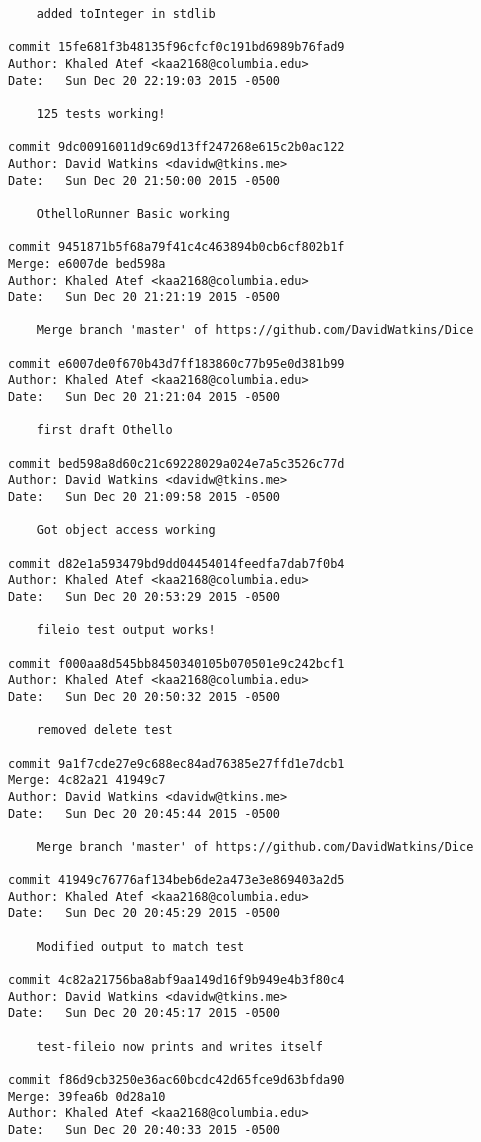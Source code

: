 \begin{verbatim}
    added toInteger in stdlib

commit 15fe681f3b48135f96cfcf0c191bd6989b76fad9
Author: Khaled Atef <kaa2168@columbia.edu>
Date:   Sun Dec 20 22:19:03 2015 -0500

    125 tests working!

commit 9dc00916011d9c69d13ff247268e615c2b0ac122
Author: David Watkins <davidw@tkins.me>
Date:   Sun Dec 20 21:50:00 2015 -0500

    OthelloRunner Basic working

commit 9451871b5f68a79f41c4c463894b0cb6cf802b1f
Merge: e6007de bed598a
Author: Khaled Atef <kaa2168@columbia.edu>
Date:   Sun Dec 20 21:21:19 2015 -0500

    Merge branch 'master' of https://github.com/DavidWatkins/Dice

commit e6007de0f670b43d7ff183860c77b95e0d381b99
Author: Khaled Atef <kaa2168@columbia.edu>
Date:   Sun Dec 20 21:21:04 2015 -0500

    first draft Othello

commit bed598a8d60c21c69228029a024e7a5c3526c77d
Author: David Watkins <davidw@tkins.me>
Date:   Sun Dec 20 21:09:58 2015 -0500

    Got object access working

commit d82e1a593479bd9dd04454014feedfa7dab7f0b4
Author: Khaled Atef <kaa2168@columbia.edu>
Date:   Sun Dec 20 20:53:29 2015 -0500

    fileio test output works!

commit f000aa8d545bb8450340105b070501e9c242bcf1
Author: Khaled Atef <kaa2168@columbia.edu>
Date:   Sun Dec 20 20:50:32 2015 -0500

    removed delete test

commit 9a1f7cde27e9c688ec84ad76385e27ffd1e7dcb1
Merge: 4c82a21 41949c7
Author: David Watkins <davidw@tkins.me>
Date:   Sun Dec 20 20:45:44 2015 -0500

    Merge branch 'master' of https://github.com/DavidWatkins/Dice

commit 41949c76776af134beb6de2a473e3e869403a2d5
Author: Khaled Atef <kaa2168@columbia.edu>
Date:   Sun Dec 20 20:45:29 2015 -0500

    Modified output to match test

commit 4c82a21756ba8abf9aa149d16f9b949e4b3f80c4
Author: David Watkins <davidw@tkins.me>
Date:   Sun Dec 20 20:45:17 2015 -0500

    test-fileio now prints and writes itself

commit f86d9cb3250e36ac60bcdc42d65fce9d63bfda90
Merge: 39fea6b 0d28a10
Author: Khaled Atef <kaa2168@columbia.edu>
Date:   Sun Dec 20 20:40:33 2015 -0500


\end{verbatim}
